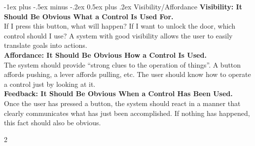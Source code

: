 \documentclass[10pt,landscape,a4paper]{article}
\makeatletter
\renewcommand{\section}{\@startsection{section}{1}{0mm}%
                                {-1ex plus -.5ex minus -.2ex}%
                                {0.5ex plus .2ex}%
                                {\normalfont\large\bfseries}}
\makeatother
\begin{document}
\begin{multicols*}{3}
\begin{multicols}{2}
\section{Visibility/Affordance}
\textbf{Visibility: It Should Be Obvious What a Control Is Used For.} \\
If I press this button, what will happen? If I want to unlock the door, which
control should I use? A system with good visibility allows the user to easily
translate goals into actions. \\
\textbf{Affordance: It Should Be Obvious How a Control Is Used.} \\
The system should provide “strong clues to the operation of things”. A button
affords pushing, a lever affords pulling, etc. The user should know how to
operate a control just by looking at it. \\
\textbf{Feedback: It Should Be Obvious When a Control Has Been Used.} \\
Once the user has pressed a button, the system should react in a manner that clearly communicates what has just been accomplished. If nothing has happened, this fact should also be obvious.
\end{multicols}{2}

\end{multicols*}
\end{document}
